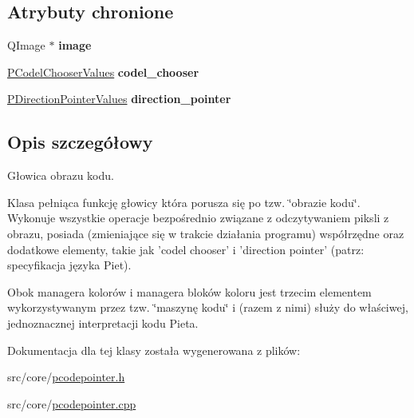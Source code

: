 \subsection*{Atrybuty chronione}
\begin{CompactItemize}
\item 
\hypertarget{classPCodePointer_9f6689e6425046abd85001f915ba1221}{
QImage $\ast$ \textbf{image}}
\label{classPCodePointer_9f6689e6425046abd85001f915ba1221}

\item 
\hypertarget{classPCodePointer_a3d7ea2563c9e1363ddcb0fb19b35f5a}{
\hyperlink{penums_8h_59dc57d526e2ce263bdf851c0d4fef3e}{PCodelChooserValues} \textbf{codel\_\-chooser}}
\label{classPCodePointer_a3d7ea2563c9e1363ddcb0fb19b35f5a}

\item 
\hypertarget{classPCodePointer_b285be0011b9b5c8b35bd1ba27ee935f}{
\hyperlink{penums_8h_6d3256570150238c718cbbb5f81c82df}{PDirectionPointerValues} \textbf{direction\_\-pointer}}
\label{classPCodePointer_b285be0011b9b5c8b35bd1ba27ee935f}

\end{CompactItemize}


\subsection{Opis szczegółowy}
Głowica obrazu kodu. 

Klasa pełniąca funkcję głowicy która porusza się po tzw. \char`\"{}obrazie kodu\char`\"{}. Wykonuje wszystkie operacje bezpośrednio związane z odczytywaniem piksli z obrazu, posiada (zmieniające się w trakcie działania programu) współrzędne oraz dodatkowe elementy, takie jak 'codel chooser' i 'direction pointer' (patrz: specyfikacja języka Piet).

Obok managera kolorów i managera bloków koloru jest trzecim elementem wykorzystywanym przez tzw. \char`\"{}maszynę kodu\char`\"{} i (razem z nimi) służy do właściwej, jednoznacznej interpretacji kodu Pieta. 

Dokumentacja dla tej klasy została wygenerowana z plików:\begin{CompactItemize}
\item 
src/core/\hyperlink{pcodepointer_8h}{pcodepointer.h}\item 
src/core/\hyperlink{pcodepointer_8cpp}{pcodepointer.cpp}\end{CompactItemize}
